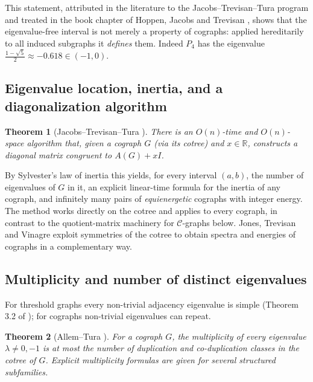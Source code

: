\documentclass[11pt]{article}
\theoremstyle{plain}
\newtheorem{theorem}{Theorem}[section]
\theoremstyle{definition}
\theoremstyle{remark}
\begin{document}
	This statement, attributed in the literature to the Jacobs--Trevisan--Tura program and treated in the book chapter of Hoppen, Jacobs and Trevisan \cite{HoppenJacobsTrevisan2022}, shows that the eigenvalue-free interval is not merely a property of cographs: applied hereditarily to all induced subgraphs it \emph{defines} them. Indeed $P_4$ has the eigenvalue $\frac{1-\sqrt5}{2}\approx-0.618\in(-1,0)$.
	
	\subsection{Eigenvalue location, inertia, and a diagonalization algorithm}
	\label{sec:location}
	
	\begin{theorem}[Jacobs--Trevisan--Tura \cite{JacobsTrevisanTura2018}]
		\label{thm:jtt2018}
		There is an $O(n)$-time and $O(n)$-space algorithm that, given a cograph $G$ (via its cotree) and $x\in\mathbb{R}$, constructs a diagonal matrix congruent to $A(G)+xI$.
	\end{theorem}
	
	By Sylvester's law of inertia this yields, for every interval $(a,b)$, the number of eigenvalues of $G$ in it, an explicit linear-time formula for the inertia of any cograph, and infinitely many pairs of \emph{equienergetic} cographs with integer energy. The method works directly on the cotree and applies to every cograph, in contrast to the quotient-matrix machinery for $\mathcal{C}$-graphs below. Jones, Trevisan and Vinagre \cite{JonesTrevisanVinagre2023} exploit symmetries of the cotree to obtain spectra and energies of cographs in a complementary way.
	
	\subsection{Multiplicity and number of distinct eigenvalues}
	\label{sec:allemtura}
	
	For threshold graphs every non-trivial adjacency eigenvalue is simple (Theorem 3.2 of \cite{MannaMandal2026}); for cographs non-trivial eigenvalues can repeat.
	
	\begin{theorem}[Allem--Tura \cite{AllemTura2018}]
		\label{thm:allemtura-mult}
		For a cograph $G$, the multiplicity of every eigenvalue $\lambda\ne0,-1$ is at most the number of duplication and co-duplication classes in the cotree of $G$. Explicit multiplicity formulas are given for several structured subfamilies.
	\end{theorem}
	
\end{document}
